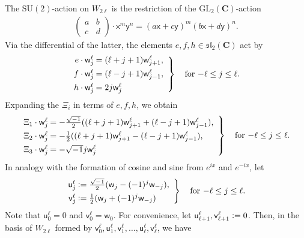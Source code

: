 \documentclass[a4paper,10pt,leqno]{article}
\numberwithin{equation}{section}
\theoremstyle{plain}
\theoremstyle{definition}
\theoremstyle{remark}
\newcommand{\bb}{\mathbf}
\newcommand{\fr}{\mathfrak}
\renewcommand{\sf}{\mathsf}
\newcommand{\GL}{\mathrm{GL}}
\newcommand{\SU}{\mathrm{SU}}
\newcommand{\mat}[1]{\begin{matrix}#1\end{matrix}}
\newcommand{\pmat}[1]{\left(\mat{#1}\right)}
\begin{document}
The $\SU(2)$-action on $W_{2\ell}$ is the restriction of the $\GL_2(\bb{C})$-action
\begin{align}
\pmat{a&b\\ c&d} \cdot \sf{x}^m \sf{y}^n = (a\sf{x} + c\sf{y})^m (b\sf{x} + d\sf{y})^n.
\end{align}
Via the differential of the latter, the elements $e, f, h \in \fr{sl}_2(\bb{C})$ act by
\begin{align}
\left.\begin{array}{@{}r@{\:}l}
e \cdot \sf{w}_j^\ell &= (\ell + j + 1) \sf{w}_{j + 1}^\ell,\\[1ex]
f \cdot \sf{w}_j^\ell &= (\ell - j + 1)\sf{w}_{j - 1}^\ell,\\[1ex]
h \cdot \sf{w}_j^\ell &= 2j\sf{w}_j^\ell
\end{array}\right\} 
\quad\text{for $-\ell \leq j \leq \ell$}.
\end{align}
Expanding the $\Xi_i$ in terms of $e, f, h$, we obtain
\begin{align}
\left.\begin{array}{@{}r@{\:}l}
\Xi_1 \cdot \sf{w}_j^\ell &= -\frac{\sqrt{-1}}{2} ((\ell + j + 1) \sf{w}_{j + 1}^\ell + (\ell - j + 1)\sf{w}_{j - 1}^\ell),\\[1ex]
\Xi_2 \cdot \sf{w}_j^\ell &= -\frac{1}{2} ((\ell + j + 1) \sf{w}_{j + 1}^\ell - (\ell - j + 1)\sf{w}_{j - 1}^\ell),\\[1ex]
\Xi_3 \cdot \sf{w}_j^\ell &= -\sqrt{-1} j\sf{w}_j^\ell
\end{array}\right\} 
\quad\text{for $-\ell \leq j \leq \ell$}.
\end{align}
In analogy with the formation of cosine and sine from $e^{ix}$ and $e^{-ix}$, let
\begin{align}
\left.\begin{array}{@{}r@{\:}l}
\sf{u}_j^\ell &\vcentcolon= \frac{\sqrt{-1}}{2} (\sf{w}_j - (-1)^j\sf{w}_{-j}),\\[1ex]
\sf{v}_j^\ell &\vcentcolon= \frac{1}{2} (\sf{w}_j + (-1)^j\sf{w}_{-j})
\end{array}\right\}
\quad\text{for $-\ell \leq j \leq \ell$}.
\end{align}
Note that $\sf{u}_0^\ell = 0$ and $\sf{v}_0^\ell = \sf{w}_0$.
For convenience, let $\sf{u}_{\ell + 1}^\ell, \sf{v}_{\ell + 1}^\ell \vcentcolon= 0$.
Then, in the basis of $W_{2\ell}$ formed by $\sf{v}_0^\ell, \sf{u}_1^\ell, \sf{v}_1^\ell, \ldots, \sf{u}_\ell^\ell, \sf{v}_\ell^\ell$, we have
\end{document}
